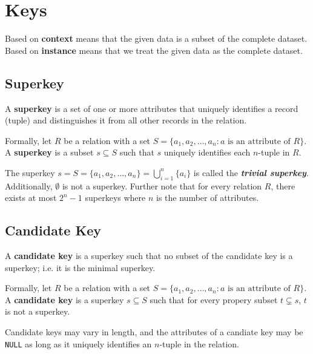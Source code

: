 \documentclass{report}
\newenvironment{definition}[1]{\begin{tcolorbox}[title={Definition: #1}]}{\end{tcolorbox}}
\newenvironment{aside}[1]{\begin{tcolorbox}[title={Aside: #1},colback=blue!5!white,colframe=black!75!blue]}{\end{tcolorbox}}
\renewcommand{\bf}[1]{\textbf{{#1}}}
\renewcommand{\tt}[1]{\texttt{{#1}}}
\newcommand{\ib}[1]{\textit{\textbf{{#1}}}}
\begin{document}
\chapter{Keys}
\begin{aside}{A Note on Context and Instance}
    Based on \bf{context} means that the given data is a subset of the complete dataset.
    \newline
    Based on \bf{instance} means that we treat the given data as the complete dataset.
\end{aside}


\section{Superkey}
\begin{definition}{Superkey}
    A \bf{superkey} is a set of one or more attributes that uniquely identifies a record (tuple) and 
    distinguishes it from all other records in the relation.\vspace{10pt}

    Formally, let $R$ be a relation with a set $S = \{a_1, a_2, \ldots, a_n : a 
    \text{ is an attribute of } R\}$. A \bf{superkey} is a subset $s \subseteq S$ such that $s$ 
    uniquely identifies each $n$-tuple in $R$.
\end{definition}
The superkey $s = S = \{a_1, a_2, \ldots, a_n\} = \bigcup^{n}_{i = 1} \{a_i\}$ is called the 
\ib{trivial superkey}. Additionally, $\emptyset$ is not a superkey. Further note that for every 
relation $R$, there exists at most $2^n - 1$ superkeys where $n$ is the number of 
attributes.


\section{Candidate Key}
\begin{definition}{Candidate Key}
    A \bf{candidate key} is a superkey such that no subset of the candidate key is a superkey; i.e.
    it is the minimal superkey. \vspace{10pt}

    Formally, let $R$ be a relation with a set $S = \{a_1, a_2, \ldots, a_n : a 
    \text{ is an attribute of } R\}$. A \bf{candidate key} is a superkey $s \subseteq S$ such that
    for every propery subset $t \subsetneq s$, $t$ is not a superkey.
\end{definition}
Candidate keys may vary in length, and the attributes of a candiate key may be \tt{NULL} as long as
it uniquely identifies an $n$-tuple in the relation.
\end{document}
